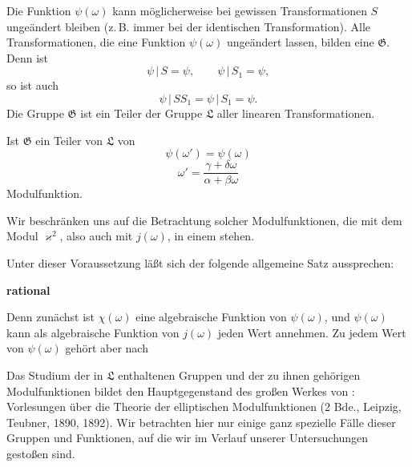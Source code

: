 Die Funktion $\psi(\omega)$ kann möglicherweise bei gewissen Transformationen
 $S$ ungeändert bleiben (z.\,B. immer bei der identischen
 Transformation). Alle Transformationen, die eine Funktion
 $\psi(\omega)$ ungeändert lassen, bilden eine  $\mathfrak{G}$. Denn ist
\[
\psi\,|\,S = \psi, \qquad \psi\,|\,S_1 = \psi,
\]
so ist auch
\[
\psi\,|\,SS_1 = \psi\,|\,S_1 = \psi.
\]
Die Gruppe $\mathfrak{G}$ ist ein Teiler der Gruppe $\mathfrak{L}$ aller linearen
Transformationen.

Ist $\mathfrak{G}$ ein Teiler von $\mathfrak{L}$ von 
\[
\psi(\omega') = \psi(\omega)
\]
\[
\omega' = \frac{\gamma+\delta\omega}{\alpha+\beta\omega}
\]
Modulfunktion.

Wir beschränken uns auf die Betrachtung solcher Modulfunktionen,
die mit dem Modul $\varkappa^2$, also auch mit $j(\omega)$, in einem
 stehen.

Unter dieser Voraussetzung läßt sich der folgende allgemeine
Satz aussprechen:

\textbf{rational} 

Denn zunächst ist $\chi(\omega)$ eine algebraische Funktion von $\psi(\omega)$,
und $\psi(\omega)$ kann als algebraische Funktion von $j(\omega)$ jeden Wert
annehmen. Zu jedem Wert von $\psi(\omega)$ gehört aber nach 

Das Studium der in $\mathfrak{L}$ enthaltenen Gruppen und der zu ihnen
gehörigen Modulfunktionen bildet den Hauptgegenstand des großen
Werkes von : \glqq Vorlesungen über die Theorie
der elliptischen Modulfunktionen\grqq{} (2 Bde., Leipzig, Teubner,
1890, 1892). Wir betrachten hier nur einige ganz spezielle Fälle
dieser Gruppen und Funktionen, auf die wir im Verlauf unserer
Untersuchungen gestoßen sind.
